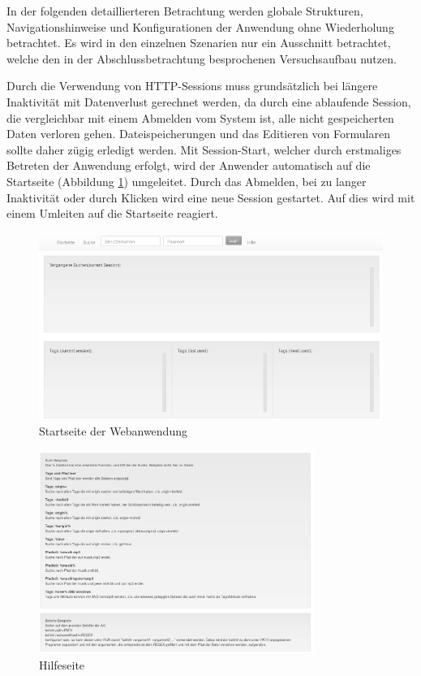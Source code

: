 \documentclass[oneside, ngerman, toc=bibliography,bibliography=totoc,listof=entryprefix, open=right,numbers=noenddot,fontsize=12pt]{scrbook}
\begin{document}
In der folgenden detaillierteren Betrachtung werden globale Strukturen, Navigationshinweise und Konfigurationen der Anwendung ohne Wiederholung betrachtet. 
Es wird in den einzelnen Szenarien nur ein Ausschnitt betrachtet, welche den in der Abschlussbetrachtung besprochenen Versuchsaufbau nutzen.

Durch die Verwendung von HTTP-Sessions muss grundsätzlich bei längere Inaktivität mit Datenverlust gerechnet werden, da durch eine ablaufende Session, die vergleichbar mit einem Abmelden vom System ist, alle nicht gespeicherten Daten verloren gehen.
Dateispeicherungen und das Editieren von Formularen sollte daher zügig erledigt werden. Mit Session-Start, welcher durch erstmaliges Betreten der Anwendung erfolgt,  wird der Anwender automatisch auf die Startseite (Abbildung \ref{fig:www-start}) umgeleitet. Durch das Abmelden, bei zu langer Inaktivität oder durch Klicken wird eine neue Session gestartet. Auf dies wird mit einem Umleiten auf die Startseite reagiert.


\begin{figure}[htbp] 
    \centering
    \includegraphics[width=\textwidth]{Masterarbeit_Bilder/www_startseite.png}
    \caption{Startseite der Webanwendung}
    \label{fig:www-start}
\end{figure}  



\begin{figure}[htbp] 
    \centering
    \includegraphics[width=0.8\textwidth]{Masterarbeit_Bilder/www_help.png}
    \caption{Hilfeseite}
    \label{fig:www-help}
\end{figure}  
\end{document}
